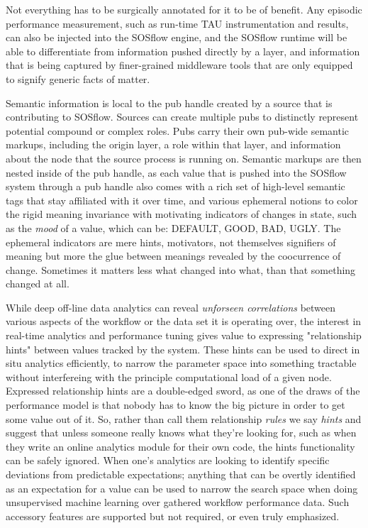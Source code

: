 Not everything has to be surgically annotated for it to be of benefit.
Any episodic performance measurement, such as run-time TAU
instrumentation and results, can also be injected into the SOSflow engine, and the
SOSflow runtime will be able to differentiate from information pushed
directly by a layer, and information that is being captured by finer-grained
middleware tools that are only equipped to signify generic facts of matter.

Semantic information is local to the pub handle created by a source
that is contributing to SOSflow.  Sources can create multiple pubs to
distinctly represent potential compound or complex roles. Pubs carry
their own pub-wide semantic markups, including the origin layer, a
role within that layer, and information about the node that the source
process is running on. Semantic markups are then nested inside of the
pub handle, as each value that is pushed into the SOSflow system
through a pub handle also comes with a rich set of high-level semantic
tags that stay affiliated with it over time, and various ephemeral
notions to color the rigid meaning invariance with motivating indicators
of changes in state, such as the \textit{mood} of a value, which can be:
DEFAULT, GOOD, BAD, UGLY. The ephemeral indicators are mere hints, motivators,
not themselves signifiers of meaning but more the glue between meanings
revealed by the coocurrence of change. Sometimes it matters less what changed
into what, than that something changed at all.

While deep off-line data analytics can reveal \textit{unforseen correlations}
between various aspects of the workflow or the data set it is
operating over, the interest in real-time analytics and performance
tuning gives value to expressing "relationship hints" between values
tracked by the system. These hints can be used to direct in situ
analytics efficiently, to narrow the parameter space into something
tractable without interfereing with the principle computational load of
a given node. Expressed relationship hints are a double-edged sword, as
one of the draws of the performance model is that nobody has to know the
big picture in order to get some value out of it. So, rather than call them
relationship \textit{rules} we say \textit{hints} and suggest that
unless someone really knows what they're looking for, such as when they write
an online analytics module for their own code, the hints functionality
can be safely ignored. When one's analytics are looking to identify
specific deviations from predictable expectations; anything that can
be overtly identified as an expectation for a value can be used to
narrow the search space when doing unsupervised machine learning over
gathered workflow performance data. Such accessory features are supported
but not required, or even truly emphasized.

